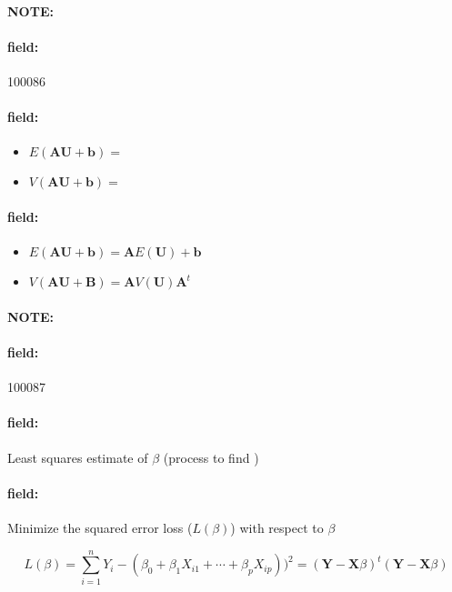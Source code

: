 \documentclass[12pt]{article}
\newenvironment{note}{\paragraph{NOTE:}}{}
\newenvironment{field}{\paragraph{field:}}{}
\begin{document}
\begin{note} \begin{field} \tiny 100086 \end{field}
 \begin{field}
  \begin{itemize}
   \item $E(\textbf{AU} + \textbf{b}) = $
   \item $V(\mathbf{AU + \mathbf{b}}) = $
  \end{itemize}
 \end{field}
 \begin{field}
  \begin{itemize}
   \item $E(\textbf{AU} + \textbf{b}) = \mathbf{A} E(\mathbf{U}) + \mathbf{b}$
   \item $V(\mathbf{AU + \mathbf{B}}) = \mathbf{A}V(\mathbf{U}) \mathbf{A}^t$
  \end{itemize}
 \end{field}
\end{note}


\begin{note} \begin{field} \tiny 100087 \end{field}
 \begin{field}
  Least squares estimate of $\beta$ (process to find )
 \end{field}
 \begin{field}
  Minimize the squared error loss ($L(\beta)$) with respect to $\beta$

  $$ L(\beta ) = \sum_{i=1}^n Y_i - (\beta_0 + \beta_1 X_{i1} + \cdots + \beta_p X_{ip}))^2 = (\mathbf{Y} - \mathbf{X}\beta)^t(\mathbf{Y} - \mathbf{X}\beta)$$
 \end{field}
\end{note}
\end{document}
